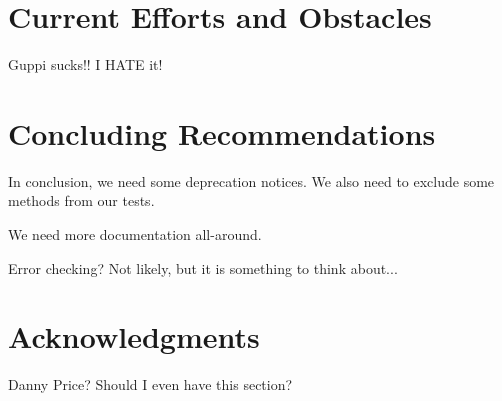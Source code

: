 \documentclass[12pt]{article}
\begin{document}
\section{Current Efforts and Obstacles}

\quad \quad Guppi sucks!! I HATE it!

\section{Concluding Recommendations}

\quad \quad In conclusion, we need some deprecation notices. We also need to exclude some methods from our tests.

We need more documentation all-around.

Error checking? Not likely, but it is something to think about...

\section{Acknowledgments}

\quad \quad Danny Price? Should I even have this section?
\end{document}
